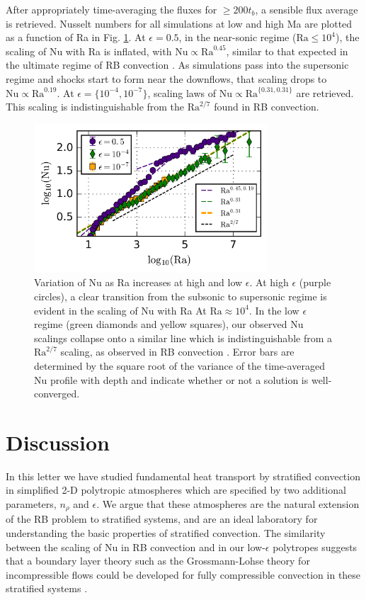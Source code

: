\documentclass[aps, prl, twocolumn, nofootinbib, groupedaddress, amsfonts, amssymb, amsmath]{revtex4-1}
\newcommand{\nrho}{\ensuremath{n_{\rho}}}
\begin{document}
After appropriately time-averaging the fluxes for $\geq 200 t_b$, 
a sensible flux average is retrieved.  Nusselt numbers for
all simulations at low and high Ma are plotted as a function of Ra in Fig. \ref{fig:nu_v_ra}.  
At $\epsilon = 0.5$, in the near-sonic
regime ($\text{Ra} \leq 10^4$), the scaling of Nu with Ra is inflated,
with $\text{Nu} \propto \text{Ra}^{0.45}$, similar to that expected in the
ultimate regime of RB convection \cite{ahlers&all2009}.  As simulations
pass into the supersonic regime and shocks start to form near the downflows,
that scaling drops to $\text{Nu} \propto \text{Ra}^{0.19}$.  
At $\epsilon = \{10^{-4}, 10^{-7}\}$,
scaling laws of $\text{Nu} \propto \text{Ra}^{\{0.31, 0.31\}}$ are retrieved. 
This scaling is indistinguishable from the $\text{Ra}^{2/7}$ found in RB
convection.


\begin{figure}[t]
\includegraphics[width=3.4375in]{./figs/nu_v_ra.png}
\caption{Variation of Nu as Ra increases at high and low $\epsilon$. 
At high $\epsilon$ (purple circles), 
a clear transition from the subsonic to supersonic regime is evident in the scaling
of Nu with Ra At $\text{Ra} \approx 10^4$.  In the low $\epsilon$ regime (green diamonds and yellow squares), 
our observed Nu scalings collapse onto a similar line which is
indistinguishable from a $\text{Ra}^{2/7}$ scaling, 
as observed in RB convection \cite{johnston&doering2009}.  Error bars are determined
 by the square root of the variance of the time-averaged Nu profile with depth and 
 indicate whether or not a solution is well-converged.
\label{fig:nu_v_ra} }
\end{figure}

\section{Discussion}
\label{sec:discussion}
In this letter we have studied fundamental heat transport by 
stratified convection in simplified 2-D polytropic
atmospheres which are specified by two additional parameters, $\nrho$ 
and $\epsilon$.  We argue that these atmospheres are the natural extension
of the RB problem to stratified systems, 
and are an ideal laboratory for understanding the basic properties of stratified
convection.  The similarity between the scaling of Nu in RB 
convection and in our low-$\epsilon$ polytropes suggests 
that a boundary layer theory such as the Grossmann-Lohse theory for incompressible flows
could be developed for fully compressible 
convection in these stratified systems \cite{ahlers&all2009}.  
\end{document}
